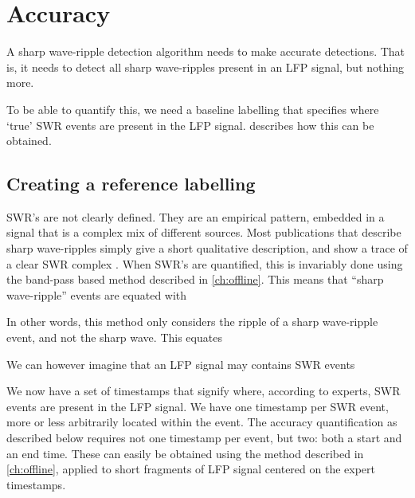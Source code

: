 
\section{Accuracy}


A sharp wave-ripple detection algorithm needs to make accurate detections. That is, it needs to detect all sharp wave-ripples present in an LFP signal, but nothing more.

To be able to quantify this, we need a baseline labelling that specifies where `true' SWR events are present in the LFP signal.  describes how this can be obtained.





\subsection{Creating a reference labelling}
\label{sec:reference_labelling}

SWR's are not clearly defined. They are an empirical pattern, embedded in a signal that is a complex mix of different sources. Most publications that describe sharp wave-ripples simply give a short qualitative description, and show a trace of a clear SWR complex \cite{Buzsaki2015}. When SWR's are quantified, this is invariably done using the band-pass based method described in \cref{ch:offline}. This means that ``sharp wave-ripple'' events are equated with 

In other words, this method only considers the ripple of a sharp wave-ripple event, and not the sharp wave. This equates 

We can however imagine that an LFP signal may contains SWR events 




We now have a set of timestamps that signify where, according to experts,  SWR events are present in the LFP signal. We have one timestamp per SWR event, more or less arbitrarily located within the event. The accuracy quantification as described below requires not one timestamp per event, but two: both a start and an end time. These can easily be obtained using the method described in \cref{ch:offline}, applied to short fragments of LFP signal centered on the expert timestamps.

